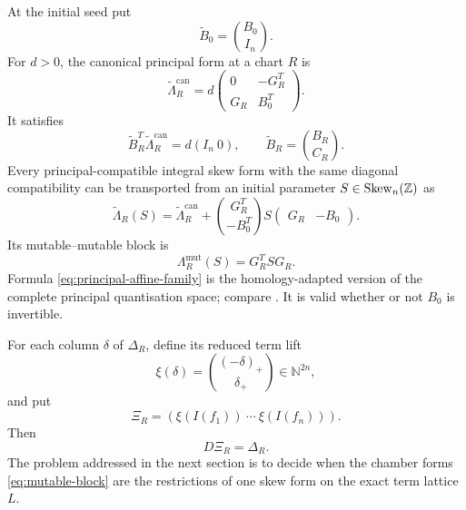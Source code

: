 At the initial seed put
\[
 \widetilde B_0=\binom{B_0}{I_n}.
\]
For $d>0$, the canonical principal form at a chart $R$ is
\begin{equation}
 \widetilde\Lambda_R^{\mathrm{can}}
 =d\begin{pmatrix}
      0&-G_R^T\\
      G_R&B_0^T
    \end{pmatrix}.
 \label{eq:canonical-principal-form}
\end{equation}
It satisfies
\[
 \widetilde B_R^T\widetilde\Lambda_R^{\mathrm{can}}
 =d(I_n\ 0),
 \qquad
 \widetilde B_R=\binom{B_R}{C_R}.
\]
Every principal-compatible integral skew form with the same diagonal
compatibility can be transported from an initial parameter
$S\in\operatorname{Skew}_n(\mathbb Z)$ as
\begin{equation}
 \widetilde\Lambda_R(S)
 =\widetilde\Lambda_R^{\mathrm{can}}
  +\binom{G_R^T}{-B_0^T}
    S
    \begin{pmatrix}G_R&-B_0\end{pmatrix}.
 \label{eq:principal-affine-family}
\end{equation}
Its mutable--mutable block is
\begin{equation}
 \Lambda_R^{\mathrm{mut}}(S)=G_R^TSG_R.
 \label{eq:mutable-block}
\end{equation}
Formula \cref{eq:principal-affine-family} is the homology-adapted version of
the complete principal quantisation space; compare
\cite{GellertLampe}.  It is valid whether or not $B_0$ is invertible.

For each column $\delta$ of $\Delta_R$, define its reduced term lift
\[
 \xi(\delta)=\binom{(-\delta)_+}{\delta_+}\in\mathbb N^{2n},
\]
and put
\begin{equation}
 \Xi_R=(\xi(I(f_1))\ \cdots\ \xi(I(f_n))).
 \label{eq:term-lift}
\end{equation}
Then
\begin{equation}
 D\Xi_R=\Delta_R.
 \label{eq:D-Xi}
\end{equation}
The problem addressed in the next section is to decide when the chamber forms
\cref{eq:mutable-block} are the restrictions of one skew form on the exact
term lattice $L$.
